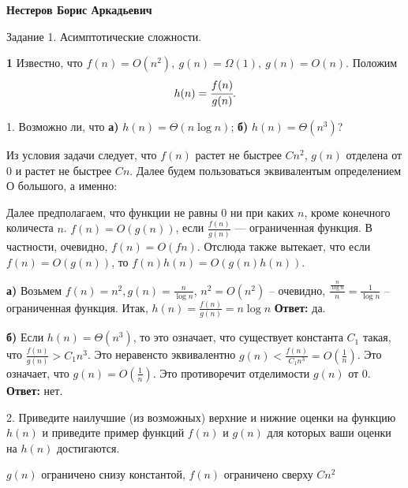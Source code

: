 \documentclass{article}
\begin{document}
\begin{center}
  \large{\textbf{Нестеров Борис Аркадьевич
    }}

  \Large {Задание 1. Асимптотические сложности.}
\end{center}

\bigskip

\textbf{1} Известно, что $f(n) = O(n^2),\ g(n) = \Omega(1),\ g(n) = O(n)$. Положим $$h(n) = \cfrac{f(n)}{g(n)}.$$

1. Возможно ли, что \textbf{а)} $h(n) = \Theta(n\log n)$; \textbf{б)} $h(n) = \Theta(n^3)$?

Из условия задачи следует, что $f(n)$ растет не быстрее $Cn^{2}$, $g(n)$
отделена от $0$ и растет не быстрее $Cn$.  Далее будем пользоваться эквивалентым
определением О большого, а именно:
\begin{center}
  Далее предполагаем, что функции не равны $0$ ни при каких $n$, кроме конечного количеста $n$.
  $f(n) = O(g(n))$, если $\frac{f(n)}{g(n)}$ --- ограниченная
  функция. В частности, очевидно, $f(n) = O(f{n})$. Отслюда также вытекает, что если $f(n) = O(g(n))$, то $f(n)h(n) = O(g(n)h(n))$.
\end{center}
\textbf{а)} Возьмем $f(n) = n^{2}, g(n) = \frac{n}{\log n}$, $n^{2} = O(n^{2})$ -- очевидно,
$\frac{\frac{n}{\log n}}{n} = \frac{1}{\log n}$ -- ограниченная функция. Итак, $h(n) = \frac{f(n)}{g(n)} = n \log n$
\textbf{Ответ:} да.

\textbf{б)} Если $h(n) = \Theta(n^{3})$, то это означает, что существует константа $C_{1}$ такая, что $\frac{f(n)}{g(n)} > C_{1}n^{3}$. Это неравенсто эквивалентно $g(n) < \frac{f(n)}{C_{1}n^{3}} = O(\frac 1 n)$. Это означает, что $g(n) = O(\frac 1 n)$.
Это противоречит отделимости $g(n)$ от $0$.
\textbf{Ответ:} нет.

2. Приведите наилучшие (из возможных) верхние и нижние оценки на функцию $h(n)$ и приведите пример функций $f(n)$ и $g(n)$ для которых ваши оценки на $h(n)$ достигаются.

$g(n)$ ограничено снизу константой, $f(n)$ ограничено сверху $Cn^{2}$
\medskip
\end{document}
